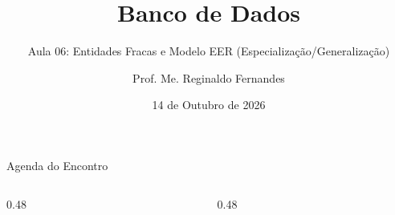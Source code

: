 \documentclass[aspectratio=169,utf8,t]{beamer}
\author{Prof. Me. Reginaldo Fernandes}
\institute{Instituto Federal do Ceará -- Campus Tauá \\ Tecnologia em Telemática}
\title{Banco de Dados}
\subtitle{Aula 06: Entidades Fracas e Modelo EER (Especialização/Generalização)}
\date{14 de Outubro de 2026}
\begin{document}
\frame[plain]{\titlepage}

\begin{frame}{Agenda do Encontro}
  \begin{columns}[t]
    \begin{column}{0.48\textwidth}
      \scriptsize
      \tableofcontents[sections={1-5}]
    \end{column}
    \begin{column}{0.48\textwidth}
      \scriptsize
      \tableofcontents[sections={6-9}]
    \end{column}
  \end{columns}
\end{frame}










\end{document}
